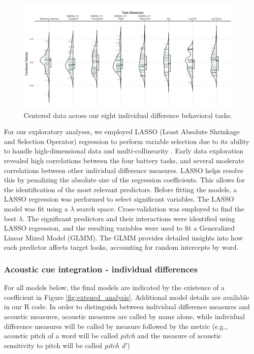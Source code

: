 \begin{figure}[H]
  \centering
  \includegraphics[width=1\linewidth]{visuals/plot_raw_task.jpeg}
  \caption{Centered data across our eight individual difference behavioral tasks.}
  \label{fig:plot_raw_task}
\end{figure}


For our exploratory analyses, we employed LASSO (Least Absolute Shrinkage and Selection Operator) regression to perform variable selection due to its ability to handle high-dimensional data and multi-collinearity \citep{Zhang2020, Tibshirani1996}. Early data exploration revealed high correlations between the four battery tasks, and several moderate correlations between other individual difference measures. LASSO helps resolve this by penalizing the absolute size of the regression coefficients. This allows for the identification of the most relevant predictors. Before fitting the models, a LASSO regression was performed to select significant variables. The LASSO model was fit using a $\lambda$ search space. Cross-validation was employed to find the best $\lambda$. The significant predictors and their interactions were identified using LASSO regression, and the resulting variables were used to fit a Generalized Linear Mixed Model (GLMM). The GLMM provides detailed insights into how each predictor affects target looks, accounting for random intercepts by word.

\subsubsection{Acoustic cue integration - individual differences}

For all models below, the final models are indicated by the existence of a coefficient in Figure \ref{fig:extened_analysis}. Additional model details are available in our R code. In order to distinguish between individual difference measures and acoustic measures, acoustic measures are called by name alone, while individual difference measures will be called by measure followed by the metric (e.g., acoustic pitch of a word will be called \textit{pitch} and the measure of acoustic sensitivity to pitch will be called \textit{pitch d$'$}) 

